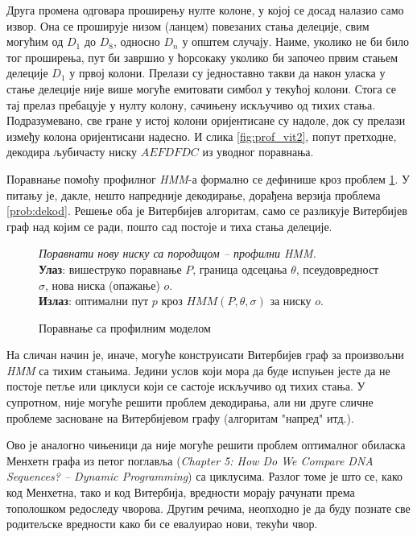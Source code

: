 \documentclass[12pt,oneside]{memoir}
\newenvironment{problem}[1][!ht]
{\renewcommand{\algorithmcfname}{Проблем}
\begin{figure}[!ht]
\centering
  \begin{minipage}{.94\linewidth}
	\begin{algorithm}[#1]%
  }{\end{algorithm}
  \end{minipage}
\end{figure}}
\begin{document}
\begin{CJK}{UTF8}{ipxm}
Друга промена одговара проширењу нулте колоне, у којој се досад налазио само извор. Она се проширује низом (ланцем) повезаних стања делеције, свим могућим од $D_1$ до $D_8$, односно $D_n$ у општем случају. Наиме, уколико не би било тог проширења, пут би завршио у ћорсокаку уколико би започео првим стањем делеције $D_1$ у првој колони. Прелази су једноставно такви да након уласка у стање делеције није више могуће емитовати симбол у текућој колони. Стога се тај прелаз пребацује у нулту колону, сачињену искључиво од тихих стања. Подразумевано, све гране у истој колони оријентисане су надоле, док су прелази између колона оријентисани надесно. И слика \ref{fig:prof_vit2}, попут претходне, декодира љубичасту ниску $AEFDFDC$ из уводног поравнања.

Поравнање помоћу профилног \textit{HMM}-а формално се дефинише кроз проблем \ref{prob:poravnanje}. У питању је, дакле, нешто напредније декодирање, дорађена верзија проблема \ref{prob:dekod}. Решење оба је Витербијев алгоритам, само се разликује Витербијев граф над којим се ради, пошто сад постоје и тиха стања делеције.

\begin{problem}[H]
  \SetAlgoLined
  \textit{Поравнати нову ниску са породицом -- профилни \textit{HMM}.}\\
  \textbf{Улаз}: вишеструко поравнање $P$, граница одсецања $\theta$, псеудовредност $\sigma$, нова ниска (опажање) $o$.\\
  \textbf{Излаз}: оптимални пут $p$ кроз $HMM(P, \theta, \sigma)$ за ниску $o$.
  \caption{Поравнање са профилним моделом\cite{ba10g}}
  \label{prob:poravnanje}
\end{problem}

На сличан начин је, иначе, могуће конструисати Витербијев граф за произвољни \textit{HMM} са тихим стањима. Једини услов који мора да буде испуњен јесте да не постоје петље или циклуси који се састоје искључиво од тихих стања. У супротном, није могуће решити проблем декодирања, али ни друге сличне проблеме засноване на Витербијевом графу (алгоритам "напред" итд.).

Ово је аналогно чињеници да није могуће решити проблем оптималног обиласка Менхетн графа из петог поглавља (\textit{Chapter 5: How Do We Compare DNA Sequences? -- Dynamic Programming}) са циклусима. Разлог томе је што се, како код Менхетна, тако и код Витербија, вредности морају рачунати према тополошком редоследу чворова. Другим речима, неопходно је да буду познате све родитељске вредности како би се евалуирао нови, текући чвор.


\end{CJK}
\end{document}
